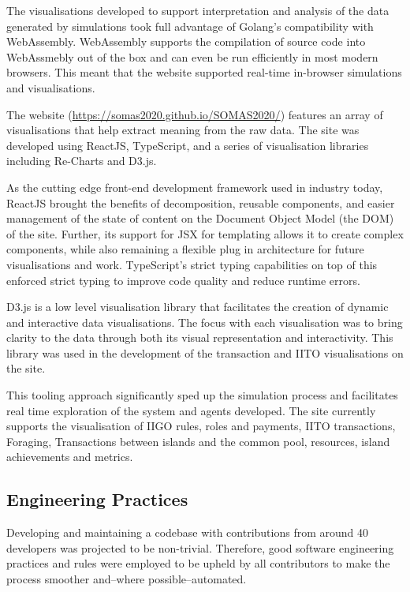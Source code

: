 The visualisations developed to support interpretation and analysis of the data generated by simulations took full advantage of Golang's compatibility with WebAssembly. WebAssembly supports the compilation of source code into WebAssmebly out of the box and can even be run efficiently in most modern browsers. This meant that the website supported real-time in-browser simulations and visualisations.

The website (\url{https://somas2020.github.io/SOMAS2020/}) features an array of visualisations that help extract meaning from the raw data. The site was developed using ReactJS, TypeScript, and a series of visualisation libraries including Re-Charts and D3.js. 

As the cutting edge front-end development framework used in industry today, ReactJS brought the benefits of decomposition, reusable components, and easier management of the state of content on the Document Object Model (the DOM) of the site. Further, its support for JSX for templating allows it to create complex components, while also remaining a flexible plug in architecture for future visualisations and work. TypeScript's strict typing capabilities on top of this enforced strict typing to improve code quality and reduce runtime errors. 

D3.js is a low level visualisation library that facilitates the creation of dynamic and interactive data visualisations. The focus with each visualisation was to bring clarity to the data through both its visual representation and interactivity. This library was used in the development of the transaction and IITO visualisations on the site. 

This tooling approach significantly sped up the simulation process and facilitates real time exploration of the system and agents developed. The site currently supports the visualisation of IIGO rules, roles and payments, IITO transactions, Foraging, Transactions between islands and the common pool, resources, island achievements and metrics.

\subsection{Engineering Practices}
\label{sec:GD:implementation:practices}

Developing and maintaining a codebase with contributions from around 40 developers was projected to be non-trivial. Therefore, good software engineering practices and rules were employed to be upheld by all contributors to make the process smoother and--where possible--automated.

